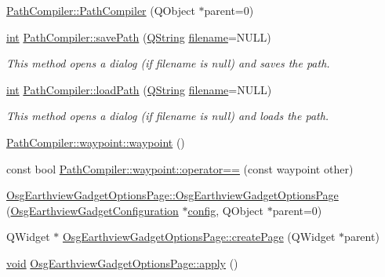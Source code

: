 \begin{DoxyCompactItemize}
\item 
\hyperlink{group___o_p_map_plugin_ga9270b91f203f6c656318dbfb7b6f0d2d}{Path\-Compiler\-::\-Path\-Compiler} (Q\-Object $\ast$parent=0)
\item 
\hyperlink{ioapi_8h_a787fa3cf048117ba7123753c1e74fcd6}{int} \hyperlink{group___o_p_map_plugin_gadd7f57ff007094b9434d1864b52c13ad}{Path\-Compiler\-::save\-Path} (\hyperlink{group___u_a_v_objects_plugin_gab9d252f49c333c94a72f97ce3105a32d}{Q\-String} \hyperlink{ioapi_8h_a7a03a664b090ce5c848ecb31cb4a2fa8}{filename}=N\-U\-L\-L)
\begin{DoxyCompactList}\small\item\em This method opens a dialog (if filename is null) and saves the path. \end{DoxyCompactList}\item 
\hyperlink{ioapi_8h_a787fa3cf048117ba7123753c1e74fcd6}{int} \hyperlink{group___o_p_map_plugin_ga6fb97167102fdadaeadd9d6686c3aea0}{Path\-Compiler\-::load\-Path} (\hyperlink{group___u_a_v_objects_plugin_gab9d252f49c333c94a72f97ce3105a32d}{Q\-String} \hyperlink{ioapi_8h_a7a03a664b090ce5c848ecb31cb4a2fa8}{filename}=N\-U\-L\-L)
\begin{DoxyCompactList}\small\item\em This method opens a dialog (if filename is null) and loads the path. \end{DoxyCompactList}\item 
\hyperlink{group___o_p_map_plugin_ga9cfe5fa7f47eec99c5410789c9a6fea2}{Path\-Compiler\-::waypoint\-::waypoint} ()
\item 
const bool \hyperlink{group___o_p_map_plugin_ga2f0a3339103075c67e70706180c208e2}{Path\-Compiler\-::waypoint\-::operator==} (const waypoint other)
\item 
\hyperlink{group___o_p_map_plugin_gae7d8f2c382b21dd6d913abc3a5b3354a}{Osg\-Earthview\-Gadget\-Options\-Page\-::\-Osg\-Earthview\-Gadget\-Options\-Page} (\hyperlink{class_osg_earthview_gadget_configuration}{Osg\-Earthview\-Gadget\-Configuration} $\ast$\hyperlink{deflate_8c_a4473b5227787415097004fd39f55185e}{config}, Q\-Object $\ast$parent=0)
\item 
Q\-Widget $\ast$ \hyperlink{group___o_p_map_plugin_gab3f0d2eb9fbf4dca4dcdb6b20c70eb52}{Osg\-Earthview\-Gadget\-Options\-Page\-::create\-Page} (Q\-Widget $\ast$parent)
\item 
\hyperlink{group___u_a_v_objects_plugin_ga444cf2ff3f0ecbe028adce838d373f5c}{void} \hyperlink{group___o_p_map_plugin_ga1c8c1c8cba26cf60acc0c25bbd8b0d23}{Osg\-Earthview\-Gadget\-Options\-Page\-::apply} ()

\end{DoxyCompactItemize}
